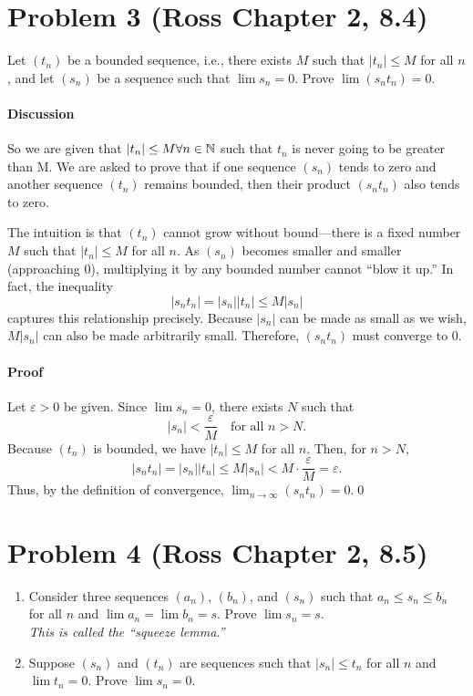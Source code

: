 \documentclass[12pt]{article}
\begin{document}
\section*{Problem 3 (Ross Chapter 2, 8.4)}
Let $(t_n)$ be a bounded sequence, i.e., there exists $M$ such that $|t_n| \le M$ for all $n$, and let $(s_n)$ be a sequence such that $\lim s_n = 0$. Prove $\lim (s_n t_n) = 0$.

\paragraph{Discussion}
So we are given that $|t_n| \leq M \space \forall \space n \in \mathbb{N}$ such that $t_n$ is never going to be greater than M. 
We are asked to prove that if one sequence $(s_n)$ tends to zero and another sequence $(t_n)$
remains bounded, then their product $(s_n t_n)$ also tends to zero. 

The intuition is that $(t_n)$ cannot grow without bound—there is a fixed number $M$ such that 
$|t_n| \le M$ for all $n$. As $(s_n)$ becomes smaller and smaller (approaching $0$), multiplying 
it by any bounded number cannot “blow it up.” In fact, the inequality 
\[
|s_n t_n| = |s_n||t_n| \le M|s_n|
\]
captures this relationship precisely. Because $|s_n|$ can be made as small as we wish, $M|s_n|$
can also be made arbitrarily small. Therefore, $(s_n t_n)$ must converge to $0$.

\paragraph{Proof}
Let $\varepsilon > 0$ be given. Since $\lim s_n = 0$, there exists $N$ such that
\[
|s_n| < \frac{\varepsilon}{M} \quad \text{for all } n > N.
\]
Because $(t_n)$ is bounded, we have $|t_n| \le M$ for all $n$. Then, for $n > N$,
\[
|s_n t_n| = |s_n||t_n| \le M|s_n| < M \cdot \frac{\varepsilon}{M} = \varepsilon.
\]
Thus, by the definition of convergence, $\lim_{n \to \infty} (s_n t_n) = 0$.\qed


\section*{Problem 4 (Ross Chapter 2, 8.5)}
\begin{enumerate}[label=\textbf{(\alph*)}]
  \item Consider three sequences $(a_n)$, $(b_n)$, and $(s_n)$ such that $a_n \le s_n \le b_n$ for all $n$ and $\lim a_n = \lim b_n = s$. Prove $\lim s_n = s$. \\
  \textit{This is called the “squeeze lemma.”}
  \item Suppose $(s_n)$ and $(t_n)$ are sequences such that $|s_n| \le t_n$ for all $n$ and $\lim t_n = 0$. Prove $\lim s_n = 0$.
\end{enumerate}
\end{document}
